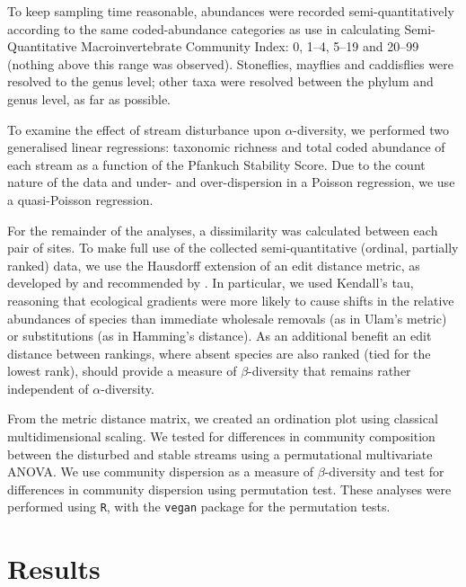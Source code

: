 \documentclass[a4paper,10pt]{article}
\begin{document}
To keep sampling time reasonable, abundances were recorded semi-quantitatively according to the same coded-abundance categories as use in calculating  Semi-Quantitative Macroinvertebrate Community Index:
0, 1--4, 5--19 and 20--99 (nothing above this range was observed).
Stoneflies, mayflies and caddisflies were resolved to the genus level; other taxa were resolved between the phylum and genus level, as far as possible.

To examine the effect of stream disturbance upon $\alpha$-diversity, we performed two generalised linear regressions: taxonomic richness and total coded abundance of each stream as a function of the Pfankuch Stability Score.
Due to the count nature of the data and under- and over-dispersion in a Poisson regression, we use a quasi-Poisson regression.

For the remainder of the analyses, a dissimilarity was calculated between each pair of sites.
To make full use of the collected semi-quantitative (ordinal, partially ranked) data, we use the Hausdorff extension of an edit distance metric, as developed by \textcite{critchlow} and recommended by \textcite{dissimilarity-partially-ranked}.
In particular, we used Kendall's tau, reasoning that ecological gradients were more likely to cause shifts in the relative abundances of species than immediate wholesale removals (as in Ulam's metric) or substitutions (as in Hamming's distance).
As an additional benefit an edit distance between rankings, where absent species are also ranked (tied for the lowest rank), should provide a measure of $\beta$-diversity that remains rather independent of $\alpha$-diversity.

From the metric distance matrix, we created an ordination plot using classical multidimensional scaling.
We tested for differences in community composition between the disturbed and stable streams using a permutational multivariate ANOVA.
We use community dispersion as a measure of $\beta$-diversity \parencite{dispersion-diversity} and test for differences in community dispersion using  permutation test.
These analyses were performed using \texttt{R}, with the \texttt{vegan} package \parencite{vegan} for the permutation tests.


\section*{Results}
\end{document}
